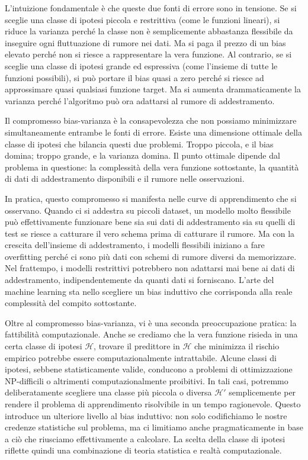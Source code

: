 L'intuizione fondamentale è che queste due fonti di errore sono in tensione. Se si sceglie una classe di ipotesi piccola e restrittiva (come le funzioni lineari), si riduce la varianza perché la classe non è semplicemente abbastanza flessibile da inseguire ogni fluttuazione di rumore nei dati. Ma si paga il prezzo di un bias elevato perché non si riesce a rappresentare la vera funzione. Al contrario, se si sceglie una classe di ipotesi grande ed espressiva (come l'insieme di tutte le funzioni possibili), si può portare il bias quasi a zero perché si riesce ad approssimare quasi qualsiasi funzione target. Ma si aumenta drammaticamente la varianza perché l'algoritmo può ora adattarsi al rumore di addestramento.

Il \alert{compromesso bias-varianza} è la consapevolezza che non possiamo minimizzare simultaneamente entrambe le fonti di errore. Esiste una dimensione ottimale della classe di ipotesi che bilancia questi due problemi. Troppo piccola, e il bias domina; troppo grande, e la varianza domina. Il punto ottimale dipende dal problema in questione: la complessità della vera funzione sottostante, la quantità di dati di addestramento disponibili e il rumore nelle osservazioni.

In pratica, questo compromesso si manifesta nelle curve di apprendimento che si osservano. Quando ci si addestra su piccoli dataset, un modello molto flessibile può effettivamente funzionare bene sia sui dati di addestramento sia su quelli di test se riesce a catturare il vero schema prima di catturare il rumore. Ma con la crescita dell'insieme di addestramento, i modelli flessibili iniziano a fare overfitting perché ci sono più dati con schemi di rumore diversi da memorizzare. Nel frattempo, i modelli restrittivi potrebbero non adattarsi mai bene ai dati di addestramento, indipendentemente da quanti dati si forniscano. L'arte del machine learning sta nello scegliere un bias induttivo che corrisponda alla reale complessità del compito sottostante.

\medskip
Oltre al compromesso bias-varianza, vi è una seconda preoccupazione pratica: la fattibilità computazionale. Anche se crediamo che la vera funzione risieda in una certa classe di ipotesi $\mathcal{H}$, trovare il predittore in $\mathcal{H}$ che minimizza il rischio empirico potrebbe essere computazionalmente intrattabile. Alcune classi di ipotesi, sebbene statisticamente valide, conducono a problemi di ottimizzazione NP-difficili o altrimenti computazionalmente proibitivi. In tali casi, potremmo deliberatamente scegliere una classe più piccola o diversa $\mathcal{H}'$ semplicemente per rendere il problema di apprendimento risolvibile in un tempo ragionevole. Questo introduce un ulteriore livello al bias induttivo: non solo codifichiamo le nostre credenze statistiche sul problema, ma ci limitiamo anche pragmaticamente in base a ciò che riusciamo effettivamente a calcolare. La scelta della classe di ipotesi riflette quindi una combinazione di teoria statistica e realtà computazionale.

